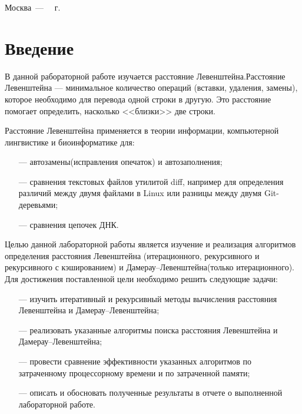 \documentclass[a4paper,14pt, unknownkeysallowed]{extreport}
\begin{document}
\begin{titlepage}
	\begin{center}
		\vfill
		Москва~---~\the\year
		~г.
	\end{center}
	\restoregeometry
\end{titlepage}


\renewcommand{\contentsname}{Содержание} 
\tableofcontents
\setcounter{page}{2}




\chapter*{Введение}

В данной рабораторной работе изучается расстояние Левенштейна.\newline Расстояние Левенштейна --- минимальное количество операций (вставки, удаления, замены), которое необходимо для перевода одной строки в другую. Это расстояние помогает определить, насколько <<близки>> две  строки.

Расстояние Левенштейна применяется в теории информации, компьютерной лингвистике и биоинформатике для:

\begin{itemize}
	\item[---] автозамены(исправления опечаток) и автозаполнения;
	\item[---] сравнения текстовых файлов утилитой diff, например для определения различий между двумя файлами в Linux или разницы между двумя Git-деревьями;
	\item[---] сравнения цепочек ДНК.
\end{itemize}

Целью данной лабораторной работы является изучение и реализация алгоритмов определения расстояния Левенштейна (итерационного, рекурсивного и рекурсивного с кэшированием) и Дамерау--Левенштейна(только итерационного). Для достижения поставленной цели необходимо решить следующие задачи:

\begin{itemize}
	\item[---] изучить итеративный и рекурсивный методы вычисления расстояния Левенштейна и Дамерау--Левенштейна;
	\item[---] реализовать указанные алгоритмы поиска расстояния Левенштейна и Дамерау--Левенштейна;
	\item[---] провести сравнение эффективности указанных алгоритмов по затраченному процессорному времени и по затраченной памяти;
	\item[---] описать и обосновать полученные результаты в отчете о выполненной лабораторной работе.
\end{itemize}
\end{document}
